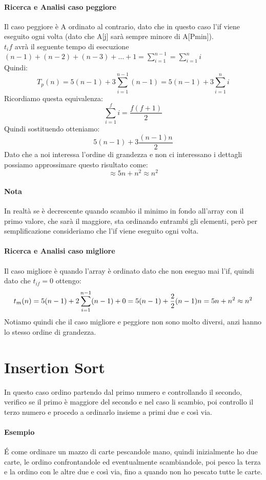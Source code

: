 \paragraph*{Ricerca e Analisi caso peggiore} Il caso peggiore è A ordinato al contrario,
dato che in questo caso l'if viene eseguito ogni volta (dato che A[j] sarà sempre minore di A[Pmin]).\\
$t_if$ avrà il seguente tempo di esecuzione $(n-1)+(n-2)+(n-3) + \dots + 1 = \sum_{i=1}^{n-1} = \sum_{i=1}^{n}i$\\
Quindi:
\begin{equation*}
    T_p(n) = 5(n-1) + 3\sum_{i=1}^{n-1}(n-1) = 5(n-1) + 3\sum_{i=1}^{n}i
\end{equation*}
Ricordiamo questa equivalenza:
\begin{equation*}
    \sum_{i=1}^{f}i = \frac{f(f+1)}{2}
\end{equation*}
Quindi sostituendo otteniamo:
\begin{equation*}
    5(n-1)+3\frac{(n-1)n}{2}
\end{equation*}
Dato che a noi interessa l'ordine di grandezza e non ci interessano i dettagli possiamo approssimare questo
risultato come:
\begin{equation*}
    \approx 5n + n^2 \approx n^2
\end{equation*}
\paragraph*{Nota} In realtà se è decrescente quando scambio il minimo in fondo all'array con il primo valore,
che sarà il maggiore, sta ordinando entrambi gli elementi, però per semplificazione consideriamo che
l'if viene eseguito ogni volta.
\paragraph*{Ricerca e Analisi caso migliore}
Il caso migliore è quando l'array è ordinato dato che non eseguo mai l'if, quindi dato che
$t_{if} = 0$ ottengo:
\begin{equation*}
    t_m(n) = 5(n-1) + 2 \sum_{i=1}^{n-1}(n-1)+0 = 5(n-1) + \frac{2}{2}(n-1)n = 5n +n^2\\
    \approx n^2
\end{equation*}
Notiamo quindi che il caso migliore e peggiore non sono molto diversi, anzi hanno lo stesso
ordine di grandezza.

\section*{Insertion Sort}
In questo caso ordino partendo dal primo numero e controllando il secondo, verifico se il primo
è maggiore del secondo e nel caso li scambio, poi controllo il terzo numero e procedo a ordinarlo
insieme a primi due e così via.
\paragraph*{Esempio} \'E come ordinare un mazzo di carte pescandole mano, quindi inizialmente ho due
carte, le ordino confrontandole ed eventualmente scambiandole, poi pesco la terza e la ordino
con le altre due e così via, fino a quando non ho pescato tutte le carte.
